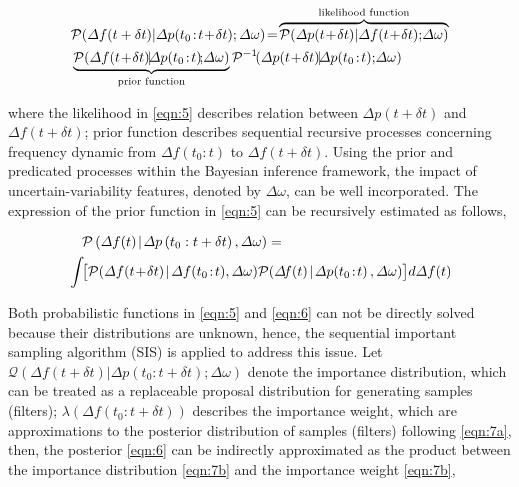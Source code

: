 \documentclass[lettersize,journal]{IEEEtran}
\begin{document}
\vspace{-0.125in} 
  \begin{newsubequations}
 	\begin{align} 
 		& \mathcal{P}(\varDelta f(t+ \delta t)|\varDelta p(t_0\!:\! t \!+\! \delta t); \varDelta \omega)\!=\!\overbrace{\mathcal{P}(\varDelta p(t\!+\!\delta t) | \varDelta f(t\!+\!\delta t); \!\varDelta\omega)}^{\textrm{{likelihood function}}} \notag\\
        & \underbrace{\mathcal{P}(\varDelta f(t\!+\! \delta t) \!|\! \varDelta p(t_0\!:\! t)\!;\! \varDelta \omega)}_{\textrm{{prior function}}} { {\mathcal{P}^{-1}\!(\varDelta p(t\!+\!\delta t) \!|\! \varDelta p(t_0\!:\! t);\!\varDelta \omega)}}\label{eqn:5}
    \end{align}
\end{newsubequations}  

\noindent where the {likelihood} in \eqref{eqn:5} describes relation between \(\varDelta p(t+\delta t)\) and \(\varDelta f(t+\delta t)\); prior function describes sequential recursive processes concerning frequency dynamic from \(\varDelta f(t_0\!:\! t)\) to \(\varDelta f(t \!+\! \delta t)\). Using the prior and predicated processes within the Bayesian inference framework, the impact of uncertain-variability features, denoted by \(\varDelta \omega\), can be well incorporated. The expression of the {prior function} in \eqref{eqn:5} can be recursively estimated as follows,

\vspace{-0.125in} 
\begin{newsubequations}
		\begin{align} 
			& \quad \mathcal{P}\left(\varDelta f(t) \!\mid\!  \varDelta p\left(t_{0}: t+\delta t \right), \varDelta \omega\right) = \label{eqn:6} \\
			& \int\! \bigl[ \mathcal{P}(\varDelta f(t\!+\! \delta t) \!\mid\! \varDelta f(t_0\!:\! t), \varDelta \omega) \mathcal{P}\!\left(\varDelta \!f(t) \!\mid\!  \varDelta p\!\left(t_{0}\!: \! t\right), \varDelta \omega\right) \bigr] d\varDelta f(t) \notag
		\end{align}
\end{newsubequations}

Both probabilistic functions in \eqref{eqn:5} and \eqref{eqn:6} can not be directly solved because their distributions are unknown, hence, the sequential important sampling algorithm (SIS) is applied to address this issue.  Let \(\mathcal{Q} (\varDelta f(t+\delta t) | \varDelta p(t_0\!:\!t+\delta t);\varDelta \omega)\) denote the importance distribution, which can be treated as a replaceable proposal distribution for
generating samples (filters); \(\lambda (\varDelta f(t_0\!:\!t\!+\!\delta t))\) describes the importance weight, which are approximations to the posterior distribution of samples (filters) following \eqref{eqn:7a}, then, the posterior \eqref{eqn:6} can be indirectly approximated as the product between the importance distribution \eqref{eqn:7b} and the importance weight \eqref{eqn:7b},
\vspace{-0.125in} 
\end{document}
